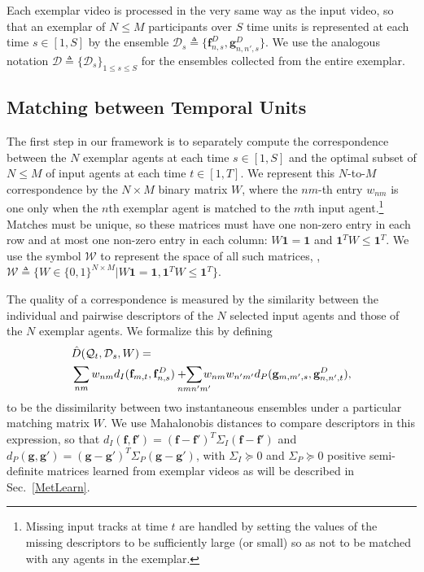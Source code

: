 Each exemplar video is processed in the very same way as the input video, so that an exemplar of $N\le M$ participants over $S$ time units is represented at each time $s\in [1,S]$ by the ensemble $\mathcal{D}_{s}\triangleq\{\mathbf{f}^{D}_{n,s},\mathbf{g}^{D}_{n,n',s}\}$. We use the analogous notation $\mathcal{D}\triangleq\{\mathcal{D}_{s}\}_{1\leq s\leq S}$ for the ensembles collected from the entire exemplar. 

\vspace{-5pt}
\subsection{Matching between Temporal Units}

\label{agg}
\vspace{-5pt}

The first step in our framework is to separately compute the correspondence between the $N$ exemplar agents at each time $s\in[1, S]$ and the optimal subset of $N\le M$ of input agents at each time $t\in[1, T]$. We represent this $N$-to-$M$ correspondence by the $N\times M$ binary matrix $W$, where the $nm$-th entry $w_{nm}$ is one only when the $n$th exemplar agent is matched to the $m$th input agent.\footnote{Missing input tracks at time $t$ are handled by setting the values of the missing descriptors to be sufficiently large (or small) so as not to be matched with any agents in the exemplar.} Matches must be unique, so these matrices must have one non-zero entry in each row and at most one non-zero entry in each column: $W\mathbf{1}=\mathbf{1}$ and $\mathbf{1}^{T}W\leq\mathbf{1}^{T}$. We use the symbol $\mathcal{W}$ to represent the space of all such matrices, \ie, $\mathcal{W}\triangleq\{W\in\{0,1\}^{N\times M}| W\mathbf{1}=\mathbf{1}, \mathbf{1}^{T}W\leq\mathbf{1}^{T}\}$.

The quality of a correspondence is measured by the similarity between the individual and pairwise descriptors of the $N$ selected input agents and those of the $N$ exemplar agents. We formalize this by defining 
\begin{equation}
\vspace{-10pt}
\begin{split}
&\hat{D}(\mathcal{Q}_{t}, \mathcal{D}_{s}, W)=\\
&\sum_{nm}w_{nm}d_{I}(\mathbf{f}_{m,t}, \mathbf{f}^{D}_{n,s})+\!\!\!\!\!\!\sum_{nmn'm'}\!\!\!\!\!w_{nm}w_{n'm'}d_{P}(\mathbf{g}_{m,m',s}, \mathbf{g}^{D}_{n,n',t}),
\end{split}
\vspace{-10pt}
\end{equation}
to be the dissimilarity between two instantaneous ensembles under a particular matching matrix $W$. We use Mahalonobis distances to compare descriptors in this expression, so that $d_{I}(\mathbf{f}, \mathbf{f}')=(\mathbf{f}-\mathbf{f}')^{T}\Sigma_{I}(\mathbf{f}-\mathbf{f}')$ and $d_{P}(\mathbf{g}, \mathbf{g}')=(\mathbf{g}-\mathbf{g}')^{T}\Sigma_{P}(\mathbf{g}-\mathbf{g}')$, with $\Sigma_{I}\succeq 0$ and $\Sigma_{P}\succeq 0$ positive semi-definite matrices learned from exemplar videos as will be described in Sec.~\ref{MetLearn}.

